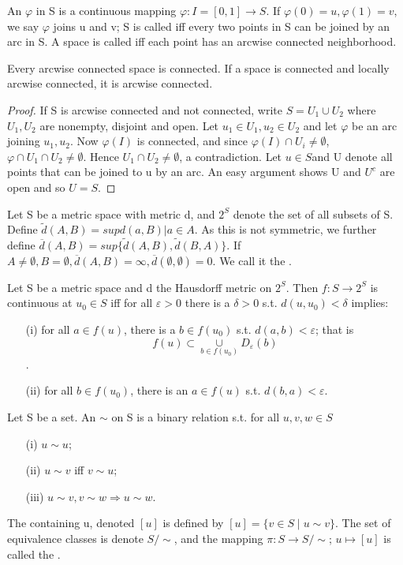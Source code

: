\begin{definition}
An  $\varphi$ in S is a continuous mapping $\varphi:I=[0,1]\rightarrow S$. If $\varphi(0)=u,\varphi(1)=v$, we say $\varphi$ 
joins u and v; S is called  iff every two points in S can be joined by an arc in S. A space is called  iff each point has an arcwise connected neighborhood.
\end{definition}
\begin{prop}
Every arcwise connected space is connected. If a space is connected and locally arcwise connected, it is arcwise connected.
\end{prop}
\begin{proof}
If S is arcwise connected and not connected, write $S=U_1\cup U_2$ where $U_1,U_2$ are nonempty, disjoint and open. Let $u_1\in U_1,
u_2\in U_2$ and let $\varphi$ be an arc joining $u_1,u_2$. Now $\varphi(I)$ is connected, and since $\varphi(I)\cap U_i\neq \emptyset$,
$\varphi\cap U_1 \cap U_2\neq\emptyset$. Hence $U_1\cap U_2\neq\emptyset$, a contradiction. Let $u\in S$and U denote all points that
can be joined to u by an arc. An easy argument shows U and $U^c$ are open and so $U=S$.
\end{proof}
\begin{definition}
Let S be a metric space with metric d, and $2^S$ denote the set of all subsets of S. Define $\tilde{d}(A,B)=sup{d(a,B)|a\in A}$. As
this is not symmetric, we further define $\overline{d}(A,B)=sup\lbrace\tilde{d}(A,B),\tilde{d}(B,A)\rbrace$. If $A\neq\emptyset,
B=\emptyset,\overline{d}(A,B)=\infty, \overline{d}(\emptyset,\emptyset)=0$. We call it the .
\end{definition}
\begin{prop}
Let S be a metric space and d the Hausdorff metric on $2^S$. Then $f:S\rightarrow 2^S$ is continuous at $u_0\in S$ iff for all
$\varepsilon>0$ there is a $\delta>0$ s.t. $d(u,u_0)<\delta$ implies:
\begin{enumerate}
\item[(i)] for all $a\in f(u)$, there is a $b\in f(u_0)$ s.t. $d(a,b)<\varepsilon$; 
that is $$f(u)\subset \underset{b\in f(u_0)}{\cup}D_\varepsilon(b)$$.
\item[(ii)] for all $b\in f(u_0)$, there is an $a\in f(u)$ s.t. $d(b,a)<\varepsilon$.
\end{enumerate}
\end{prop}
\begin{definition}
Let S be a set. An  $\sim$ on S is a binary relation s.t. for all $u,v,w\in S$
\begin{enumerate}
\item[(i)] $u\sim u$;
\item[(ii)] $u\sim v$ iff $v\sim u$;
\item[(iii)] $u\sim v, v\sim w \Rightarrow u\sim w$.
\end{enumerate}
The  containing u, denoted $[u]$ is defined by $[u]=\lbrace v\in S\mid u\sim v\rbrace$. The set of equivalence
classes is denote $S/\sim$, and the mapping $\pi:S\rightarrow S/\sim$; $u\longmapsto [u]$ is called the .
\end{definition}
